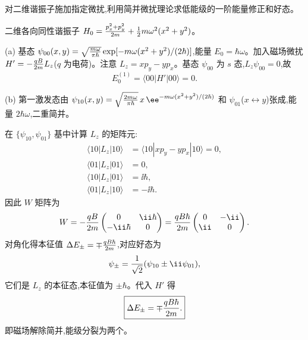 \begin{question}
对二维谐振子施加指定微扰,利用简并微扰理论求低能级的一阶能量修正和好态。
\begin{solution}
二维各向同性谐振子 $H_0 = {p_x^2+p_y^2\over2m}+{1\over2}m\omega^2(x^2+y^2)$。

(a) 基态 $\psi_{00}(x,y)=\sqrt{m\omega\over\pi\hbar}\exp[-m\omega(x^2+y^2)/(2\hbar)]$,能量 $E_0=\hbar\omega$。加入磁场微扰 $H' = -{qB\over2m}L_z$($q$ 为电荷)。注意 $L_z = xp_y - yp_x$。基态 $\psi_{00}$ 为 $s$ 态,$L_z\psi_{00}=0$,故
\[
E_0^{(1)}=\langle00|H'|00\rangle=0.
\]

(b) 第一激发态由 $\psi_{10}(x,y)=\sqrt{2m\omega\over\pi\hbar}\,x\,\ee^{-m\omega(x^2+y^2)/(2\hbar)}$ 和 $\psi_{01}$($x\leftrightarrow y$)张成,能量 $2\hbar\omega$,二重简并。

在 $\{\psi_{10},\psi_{01}\}$ 基中计算 $L_z$ 的矩阵元:
\[
\begin{aligned}
\langle10|L_z|10\rangle &= \langle10|xp_y-yp_x|10\rangle = 0,\\
\langle01|L_z|01\rangle &= 0,\\
\langle10|L_z|01\rangle &= \ii\hbar,\\
\langle01|L_z|10\rangle &= -\ii\hbar.
\end{aligned}
\]
因此 $W$ 矩阵为
\[
W = -{qB\over2m}\begin{pmatrix}0 & \ii\hbar\\ -\ii\hbar & 0\end{pmatrix}
= {qB\hbar\over2m}\begin{pmatrix}0 & -\ii\\ \ii & 0\end{pmatrix}.
\]
对角化得本征值 $\Delta E_\pm = \mp {qB\hbar\over2m}$,对应好态为
\[
\psi_\pm = {1\over\sqrt2}(\psi_{10} \pm \ii\psi_{01}),
\]
它们是 $L_z$ 的本征态,本征值为 $\pm\hbar$。代入 $H'$ 得
\[
\boxed{\Delta E_\pm = \mp {qB\hbar\over2m}.}
\]
即磁场解除简并,能级分裂为两个。
\end{solution}
\end{question}

